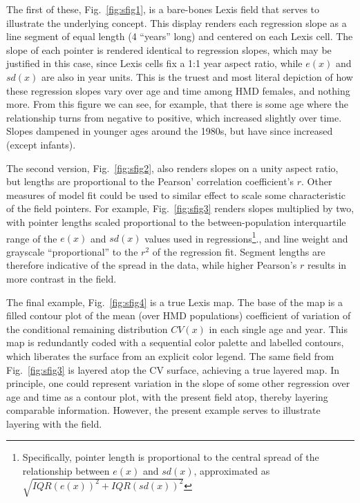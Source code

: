 \documentclass{article}
\begin{document}
The first of these, Fig.~\ref{fig:sfig1}, is a bare-bones Lexis field that serves to illustrate the underlying concept. This display renders each regression slope as a line segment of equal length (4 ``years'' long) and centered on each Lexis cell. The slope of each pointer is rendered identical to regression slopes, which may be justified in this case, since Lexis cells fix a 1:1 year aspect ratio, while $e(x)$ and $sd(x)$ are also in year units. This is the truest and most literal depiction of how these regression slopes vary over age and time among HMD females, and nothing more. From this figure we can see, for example, that there is some age where the relationship turns from negative to positive, which increased slightly over time. Slopes dampened in younger ages around the 1980s, but have since increased (except infants).

The second version, Fig.~\ref{fig:sfig2}, also renders slopes on a unity aspect ratio, but lengths are proportional to the Pearson' correlation coefficient's $r$. Other measures of model fit could be used to similar effect to scale some characteristic of the field pointers. For example, Fig.~\ref{fig:sfig3} renders slopes multiplied by two, with pointer lengths scaled proportional to the between-population interquartile range of the $e(x)$ and $sd(x)$ values used in regressions\footnote{Specifically, pointer length is proportional to the central spread of the relationship between $e(x)$ and $sd(x)$, approximated as $\sqrt{IQR(e(x))^2 + IQR(sd(x))^2}$}., and line weight and grayscale ``proportional'' to the $r^2$ of the regression fit. Segment lengths are therefore indicative of the spread in the data, while higher Pearson's $r$ results in more contrast in the field. 

The final example, Fig.~\ref{fig:sfig4} is a true Lexis map. The base of the map is a filled contour plot of the mean (over HMD populations) coefficient of variation of the conditional remaining distribution $CV(x)$ in each single age and year. This map is redundantly coded with a sequential color palette and labelled contours, which liberates the surface from an explicit color legend. The same field from Fig.~\ref{fig:sfig3} is layered atop the CV surface, achieving a true layered map. In principle, one could represent variation in the slope of some other regression over age and time as a contour plot, with the present field atop, thereby layering comparable information. However, the present example serves to illustrate layering with the field.
\end{document}
